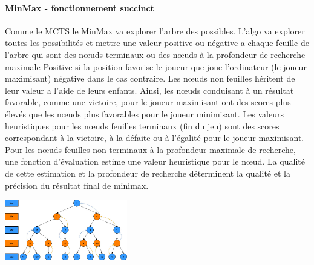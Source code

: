 \paragraph {MinMax - fonctionnement succinct}
Comme le MCTS le MinMax va explorer l'arbre des possibles. L'algo va explorer toutes les possibilités et mettre une valeur positive ou négative
a chaque feuille de l'arbre qui sont des nœuds terminaux ou des nœuds à la profondeur de recherche maximale Positive si la position favorise le joueur 
que joue l'ordinateur (le joueur maximisant) négative dans le cas contraire. Les nœuds non feuilles héritent de leur valeur a l'aide de leurs enfants.
Ainsi, les nœuds conduisant à un résultat favorable, comme une victoire, pour le joueur maximisant ont des scores plus élevés que les nœuds 
plus favorables pour le joueur minimisant. Les valeurs heuristiques pour les nœuds feuilles terminaux (fin du jeu) sont des scores correspondant 
à la victoire, à la défaite ou à l'égalité pour le joueur maximisant. Pour les nœuds feuilles non terminaux à la profondeur maximale de recherche, 
une fonction d'évaluation estime une valeur heuristique pour le nœud. La qualité de cette estimation et la profondeur de recherche déterminent la 
qualité et la précision du résultat final de minimax.

\includegraphics[width=0.4\textwidth]{root/MinMax.jpeg}~\\[1cm]